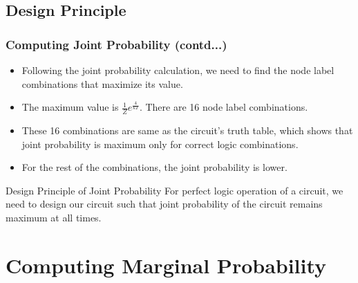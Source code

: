 \documentclass{beamer}
\begin{document}
\subsection{Design Principle}
\begin{frame}
\frametitle{Computing Joint Probability (contd...)}
\begin{flushleft}
\begin{itemize}
\item Following the joint probability calculation, we need to find the node label combinations that maximize its value.
\item The maximum value is $\frac{1}{Z}e^{\frac{4}{kT}}$. There are 16 node label combinations.
\item These 16 combinations are same as the circuit's truth table, which shows that joint probability is maximum only for correct logic combinations.
\item For the rest of the combinations, the joint probability is lower.
\end{itemize}
\begin{block}{Design Principle of Joint Probability}
For perfect logic operation of a circuit, we need to design our circuit such that joint probability of the circuit remains maximum at all times.
\end{block}
\end{flushleft}
\end{frame}
\section{Computing Marginal Probability}
\end{document}
